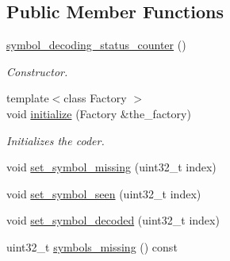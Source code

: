 \subsection*{Public Member Functions}
\begin{DoxyCompactItemize}
\item 
\hypertarget{classkodo_1_1symbol__decoding__status__counter_a976783389e62d4637fafd7a811065bf3}{\hyperlink{classkodo_1_1symbol__decoding__status__counter_a976783389e62d4637fafd7a811065bf3}{symbol\-\_\-decoding\-\_\-status\-\_\-counter} ()}\label{classkodo_1_1symbol__decoding__status__counter_a976783389e62d4637fafd7a811065bf3}

\begin{DoxyCompactList}\small\item\em Constructor. \end{DoxyCompactList}\item 
{\footnotesize template$<$class Factory $>$ }\\void \hyperlink{classkodo_1_1symbol__decoding__status__counter_a8559a9d661957c072c722dd7e1cd70a4}{initialize} (Factory \&the\-\_\-factory)
\begin{DoxyCompactList}\small\item\em Initializes the coder. \end{DoxyCompactList}\item 
void \hyperlink{classkodo_1_1symbol__decoding__status__counter_a94b69d06fe168d75293fa2e3fbc0bfb9}{set\-\_\-symbol\-\_\-missing} (uint32\-\_\-t index)
\begin{DoxyCompactList}\small\item\em \end{DoxyCompactList}\item 
void \hyperlink{classkodo_1_1symbol__decoding__status__counter_a4a2564a440f41a0f66b78a9f117deb21}{set\-\_\-symbol\-\_\-seen} (uint32\-\_\-t index)
\begin{DoxyCompactList}\small\item\em \end{DoxyCompactList}\item 
void \hyperlink{classkodo_1_1symbol__decoding__status__counter_a9e5a9ed0b7c4639d7fe64653ab199a4f}{set\-\_\-symbol\-\_\-decoded} (uint32\-\_\-t index)
\begin{DoxyCompactList}\small\item\em \end{DoxyCompactList}\item 
uint32\-\_\-t \hyperlink{classkodo_1_1symbol__decoding__status__counter_a46c35ce7a13620b970c66eabd2b42a92}{symbols\-\_\-missing} () const 

\end{DoxyCompactItemize}
